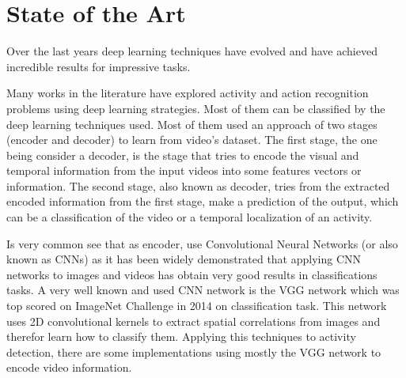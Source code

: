 \chapter{State of the Art}

Over the last years deep learning techniques have evolved and have achieved incredible results for impressive tasks.




Many works in the literature have explored activity and action recognition problems using deep learning strategies. Most of them can be classified by the deep learning techniques used. Most of them used an approach of two stages (encoder and decoder) to learn from video's dataset. The first stage, the one being consider a decoder, is the stage that tries to encode the visual and temporal information from the input videos into some features vectors or information. The second stage, also known as decoder, tries from the extracted encoded information from the first stage, make a prediction of the output, which can be a classification of the video or a temporal localization of an activity.

Is very common see that as encoder, use Convolutional Neural Networks (or also known as CNNs) as it has been widely demonstrated that applying CNN networks to images and videos has obtain very good results in classifications tasks. A very well known and used CNN network is the VGG\cite{Simonyan14c} network which was top scored on ImageNet Challenge in 2014 on classification task. This network uses 2D convolutional kernels to extract spatial correlations from images and therefor learn how to classify them. Applying this techniques to activity detection, there are some implementations\cite{simonyan2014two}\cite{yeung2015every}\cite{Ng_2015_CVPR}\cite{ballas2015delving} using mostly the VGG network to encode video information.

